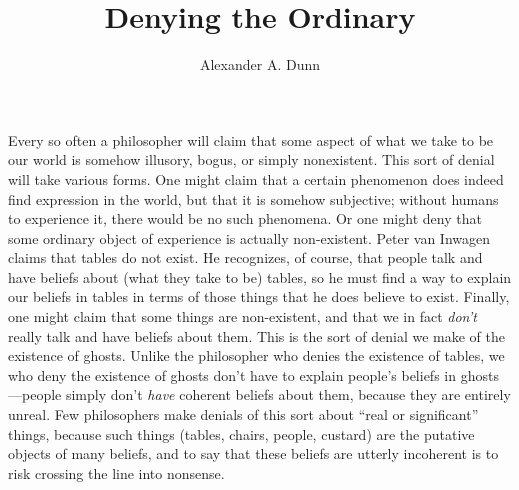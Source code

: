 \documentclass[11pt]{article}
\title{Denying the Ordinary}
\author{Alexander A. Dunn}
\newenvironment{inq}{\vspace{0pt}%
	\begin{list}{}%
	{\setlength\labelwidth{0pt}%
	\setlength\leftmargin{2.5\oddsidemargin}%
	\setlength\rightmargin{\leftmargin}}
	\begin{spacing}{1}
	\item[]%
	}{
	\end{spacing}
	\end{list}
	\vspace{10pt}
	}
\begin{document}
\ifstandalone
\maketitle
\begin{spacing}{1.5}
\fi



\noindent Every so often a philosopher will claim that some aspect of what we take to be our world is somehow illusory, bogus, or simply nonexistent. This sort of denial will take various forms. One might claim that a certain phenomenon does indeed find expression in the world, but that it is somehow subjective; without humans to experience it, there would be no such phenomena. Or one might deny that some ordinary object of experience is actually non-existent. Peter van Inwagen claims that tables do not exist. He recognizes, of course, that people talk and have beliefs about (what they take to be) tables, so he must find a way to explain our beliefs in tables in terms of those things that he does believe to exist. Finally, one might claim that some things are non-existent, and that we in fact {\em don't} really talk and have beliefs about them. This is the sort of denial we make of the existence of ghosts. Unlike the philosopher who denies the existence of tables, we who deny the existence of ghosts don't have to explain people's beliefs in ghosts---people simply don't {\em have} coherent beliefs about them, because they are entirely unreal. Few philosophers make denials of this sort about ``real or significant'' things, because such things (tables, chairs, people, custard) are the putative objects of many beliefs, and to say that these beliefs are utterly incoherent is to risk crossing the line into nonsense.%


\end{spacing}
\end{document}
